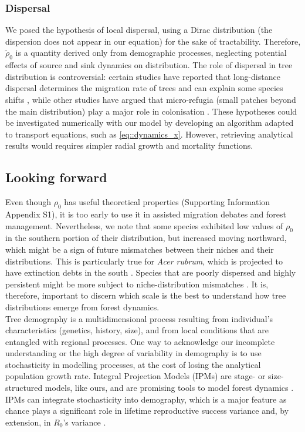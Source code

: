 \subsubsection{Dispersal}
We posed the hypothesis of local dispersal, using a Dirac distribution (\ie the dispersion does not appear in our equation) for the sake of tractability. Therefore, $ \tilde \rho_0 $ is a quantity derived only from demographic processes, neglecting potential effects of source and sink dynamics on distribution. The role of dispersal in tree distribution is controversial: certain studies have reported that long-distance dispersal determines the migration rate of trees and can explain some species shifts \citep[and references therein]{Nathan2002}, while other studies have argued that micro-refugia (small patches beyond the main distribution) play a major role in colonisation \citep[and references therein]{Feurdean2013}. These hypotheses could be investigated numerically with our model by developing an algorithm adapted to transport equations, such as \eqref{eq::dynamics_x}. However, retrieving analytical results would requires simpler radial growth and mortality functions.

\subsection{Looking forward}
Even though $ \rho_0 $ has useful theoretical properties (Supporting Information Appendix S1), it is too early to use it in assisted migration debates and forest management. Nevertheless, we note that some species exhibited low values of $ \rho_0 $ in the southern portion of their distribution, but increased moving northward, which might be a sign of future mismatches between their niches and their distributions. This is particularly true for \textit{Acer rubrum}, which is projected to have extinction debts in the south \citep{Talluto2017a}. Species that are poorly dispersed and highly persistent might be more subject to niche-distribution mismatches \citep[on shrubs, not trees, in the family Proteaceae in South Africa]{Pagel2020}. It is, therefore, important to discern which scale is the best to understand how tree distributions emerge from forest dynamics. \\

Tree demography is a multidimensional process resulting from individual's characteristics (\eg genetics, history, size), and from local conditions that are entangled with regional processes. One way to acknowledge our incomplete understanding or the high degree of variability in demography is to use stochasticity in modelling processes, at the cost of losing the analytical population growth rate. Integral Projection Models (IPMs) are stage- or size-structured models, like ours, and are promising tools to model forest dynamics \citep{Vindenes2012, Kunstler2019, Merow2014}. IPMs can integrate stochasticity into demography, which is a major feature as chance plays a significant role in lifetime reproductive success variance and, by extension, in $ R_0 $'s variance \citep{Snyder2016, Snyder2018}.

